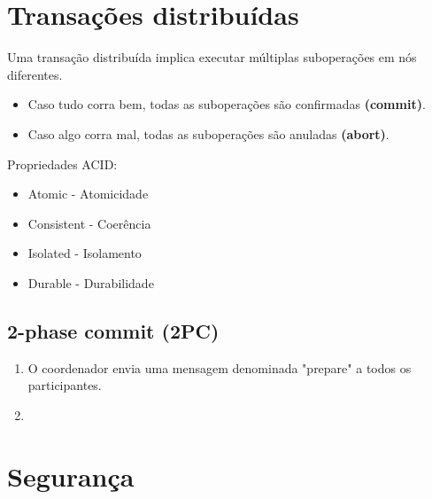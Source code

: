 \documentclass[12pt]{article}
\begin{document}
\newpage

\section{Transações distribuídas}

Uma transação distribuída implica executar múltiplas suboperações em nós diferentes.
\begin{itemize}
    \item Caso tudo corra bem, todas as suboperações são confirmadas \textbf{(commit)}.
    \item Caso algo corra mal, todas as suboperações são anuladas \textbf{(abort)}.
\end{itemize}

Propriedades ACID:
\begin{itemize}
    \item Atomic - Atomicidade
    \item Consistent - Coerência
    \item Isolated - Isolamento
    \item Durable - Durabilidade
\end{itemize}

\subsection{2-phase commit (2PC)}

\begin{enumerate}
    \item O coordenador envia uma mensagem denominada "prepare" a todos os participantes.
    \item 
\end{enumerate}

\newpage

\section{Segurança}
\end{document}
